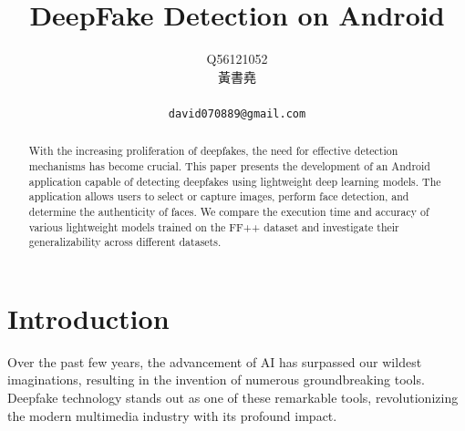 \documentclass[10pt,twocolumn,letterpaper]{article}
\begin{document}
\title{DeepFake Detection on Android}
\author{Q56121052 \begin{CJK*}{UTF8}{bsmi}黃書堯
\end{CJK*}\\
{\tt\small david070889@gmail.com}
}
\maketitle


\begin{abstract}
With the increasing proliferation of deepfakes, the need for effective detection mechanisms has become crucial. This paper presents the development of an Android application capable of detecting deepfakes using lightweight deep learning models. The application allows users to select or capture images, perform face detection, and determine the authenticity of faces. We compare the execution time and accuracy of various lightweight models trained on the FF++\cite{Rossler_2019_ICCV} dataset and investigate their generalizability across different datasets.
\end{abstract}
\section{Introduction}
\label{sec:intro}
Over the past few years, the advancement of AI has surpassed our wildest imaginations, resulting in the invention of numerous groundbreaking tools. Deepfake technology stands out as one of these remarkable tools, revolutionizing the modern multimedia industry with its profound impact.
\end{document}
